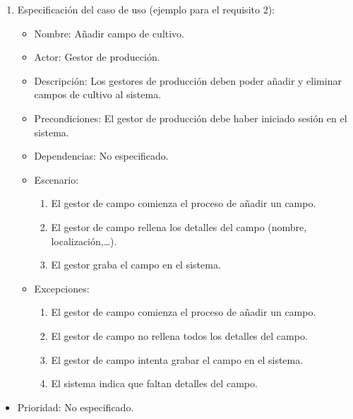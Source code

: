 \begin{solucion}
\begin{enumerate}
        \item Especificación del caso de uso (ejemplo para el requisito 2):
        \begin{itemize}
            \item Nombre: Añadir campo de cultivo.
            \item Actor: Gestor de producción.
            \item Descripción: Los gestores de producción deben poder añadir y eliminar campos de cultivo al sistema.
            \item Precondiciones: El gestor de producción debe haber iniciado sesión en el sistema.
            \item Dependencias: No especificado.
            \item Escenario:
            \begin{enumerate}
                \item El gestor de campo comienza el proceso de añadir un campo.
                \item El gestor de campo rellena los detalles del campo (nombre, localización,\ldots ).
                \item El gestor graba el campo en el sistema.
            \end{enumerate}
            \item Excepciones:
            \begin{enumerate}
                \item El gestor de campo comienza el proceso de añadir un campo.
                \item El gestor de campo no rellena todos los detalles del campo.
                \item El gestor de campo intenta grabar el campo en el sistema.
                \item El sistema indica que faltan detalles del campo.
            \end{enumerate}
        \end{itemize}
    \end{enumerate}
    \begin{itemize}
        \item Prioridad: No especificado.
    \end{itemize}
\end{solucion}